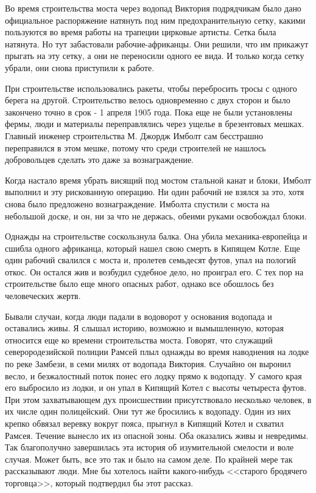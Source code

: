 \documentclass[12pt,a4paper,twoside,openany,svgnames]{memoir}
\begin{document}
Во время строительства моста через водопад Виктория подрядчикам было дано официальное распоряжение натянуть под ним предохранительную сетку, какими пользуются во время работы на трапеции цирковые артисты. Сетка была натянута. Но тут забастовали рабочие-африканцы. Они решили, что им прикажут прыгать на эту сетку, а они не переносили одного ее вида. И только когда сетку убрали, они снова приступили к работе.

При строительстве использовались ракеты, чтобы перебросить тросы с одного берега на другой. Строительство велось одновременно с двух сторон и было закончено точно в срок - 1 апреля 1905 года. Пока еще не были установлены фермы, люди и материалы переправлялись через ущелье в брезентовых мешках. Главный инженер строительства М. Джордж Имболт сам бесстрашно переправился в этом мешке, потому что среди строителей не нашлось добровольцев сделать это даже за вознаграждение.

Когда настало время убрать висящий под мостом стальной канат и блоки, Имболт выполнил и эту рискованную операцию. Ни один рабочий не взялся за это, хотя снова было предложено вознаграждение. Имболта спустили с моста на небольшой доске, и он, ни за что не держась, обеими руками освобождал блоки.

Однажды на строительстве соскользнула балка. Она убила механика-европейца и сшибла одного африканца, который нашел свою смерть в Кипящем Котле. Еще один рабочий свалился с моста и, пролетев семьдесят футов, упал на пологий откос. Он остался жив и возбудил судебное дело, но проиграл его. С тех пор на строительстве было еще много опасных работ, однако все обошлось без человеческих жертв.

Бывали случаи, когда люди падали в водоворот у основания водопада и оставались живы. Я слышал историю, возможно и вымышленную, которая относится еще ко времени строительства моста. Говорят, что служащий северородезийской полиции Рамсей плыл однажды во время наводнения на лодке по реке Замбези, в семи милях от водопада Виктория. Случайно он выронил весло, и безжалостный поток понес его лодку прямо к водопаду. У самого края его выбросило из лодки, и он упал в Кипящий Котел с высоты четыреста футов. При этом захватывающем дух происшествии присутствовало несколько человек, в их числе один полицейский. Они тут же бросились к водопаду. Один из них крепко обвязал веревку вокруг пояса, прыгнул в Кипящий Котел и схватил Рамсея. Течение вынесло их из опасной зоны. Оба оказались живы и невредимы. Так благополучно завершилась эта история об изумительной смелости и воле случая. Может быть, все это так и было на самом деле. По крайней мере так рассказывают люди. Мне бы хотелось найти какого-нибудь <<старого бродячего торговца>>, который подтвердил бы этот рассказ.
\end{document}
